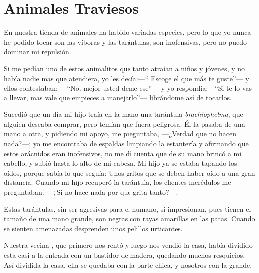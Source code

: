 \documentclass[letterpaper, 12pt]{book}
\begin{document}
\chapter{Animales Traviesos}
En nuestra tienda de animales ha habido variadas especies, pero lo que yo nunca he podido tocar son las víboras y las tarántulas; son inofensivas, pero no puedo dominar mi repulsión.

Si me pedían uno de estos animalitos que tanto atraían a niños y jóvenes, y no había nadie mas que atendiera, yo les decía:---`` Escoge el que más te guste''--- y ellos contestaban: ---``No, mejor usted deme ese''--- y yo respondía:---``Si te lo vas a llevar, mas vale que empieces a manejarlo''--- librándome así de tocarlos.

Sucedió que un día mi hijo traía en la mano una tarántula {\it brachiophelma}, que alguien deseaba comprar, pero temían que fuera peligrosa. Él la pasaba de una mano a otra, y pidiendo mi apoyo, me preguntaba, ---¿Verdad que no hacen nada?---; yo me encontraba de espaldas limpiando la estantería y afirmando que estos arácnidos eran inofensivos, no me dí cuenta que de su mano brincó a mi cabello, y subió hasta lo alto de mi cabeza. Mi hijo ya se estaba tapando los oídos, porque sabía lo que seguía: Unos gritos que se deben haber oído a una gran distancia. Cuando mi hijo recuperó la tarántula, los clientes incrédulos me preguntaban: ---¿Si no hace nada por que grita tanto?---.

Estas tarántulas, sin ser agresivas para el humano, si impresionan, pues tienen el tamaño de una mano grande, son negras con rayas amarillas en las patas. Cuando se sienten amenazadas desprenden unos pelillos urticantes.

Nuestra vecina , que primero nos rentó y luego nos vendió la casa, había dividido esta casi a la entrada con un bastidor de madera, quedando muchos resquicios. Así dividida la  casa, ella se quedaba con la parte chica, y nosotros con la grande.
\end{document}
